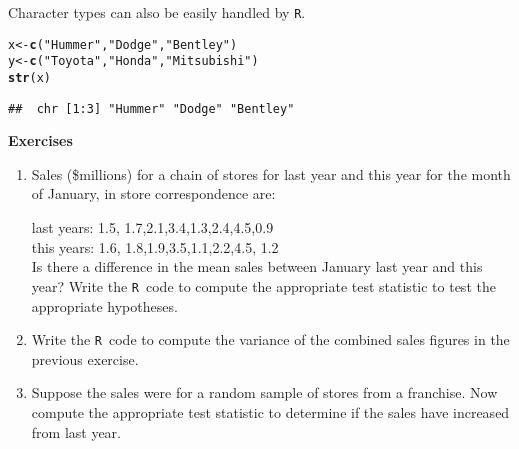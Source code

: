 \documentclass[12pt,A4,makeidx]{article}\usepackage[]{graphicx}\usepackage[]{xcolor}
\makeatletter
\newcommand{\hlstr}[1]{\textcolor[rgb]{0.192,0.494,0.8}{#1}}%
\newcommand{\hlstd}[1]{\textcolor[rgb]{0.345,0.345,0.345}{#1}}%
\newcommand{\hlkwb}[1]{\textcolor[rgb]{0.69,0.353,0.396}{#1}}%
\newcommand{\hlkwd}[1]{\textcolor[rgb]{0.737,0.353,0.396}{\textbf{#1}}}%
\newenvironment{kframe}{%
 \def\at@end@of@kframe{}%
 \ifinner\ifhmode%
  \def\at@end@of@kframe{\end{minipage}}%
  \begin{minipage}{\columnwidth}%
 \fi\fi%
 \def\FrameCommand##1{\hskip\@totalleftmargin \hskip-\fboxsep
 \colorbox{shadecolor}{##1}\hskip-\fboxsep
     \hskip-\linewidth \hskip-\@totalleftmargin \hskip\columnwidth}%
 \MakeFramed {\advance\hsize-\width
   \@totalleftmargin\z@ \linewidth\hsize
   \@setminipage}}%
 {\par\unskip\endMakeFramed%
 \at@end@of@kframe}
\newenvironment{knitrout}{}{} %
\newcommand{\tR}{\texttt{R}}
\makeatother
\begin{document}
Character types can also be easily handled by \tR.
\begin{knitrout}
\color{fgcolor}\begin{kframe}
\begin{alltt}
\hlstd{x}\hlkwb{<-}\hlkwd{c}\hlstd{(}\hlstr{"Hummer"}\hlstd{,}\hlstr{"Dodge"}\hlstd{,}\hlstr{"Bentley"}\hlstd{)}
\hlstd{y}\hlkwb{<-}\hlkwd{c}\hlstd{(}\hlstr{"Toyota"}\hlstd{,}\hlstr{"Honda"}\hlstd{,}\hlstr{"Mitsubishi"}\hlstd{)}
\hlkwd{str}\hlstd{(x)}
\end{alltt}
\begin{verbatim}
##  chr [1:3] "Hummer" "Dodge" "Bentley"
\end{verbatim}
\end{kframe}
\end{knitrout}

\vspace{0.5in}
{\bf Exercises}
\begin{enumerate}
\item Sales (\$millions)
for a chain of stores for last year and this year 
for the month of January, in store correspondence are:

last years: 1.5, 1.7,2.1,3.4,1.3,2.4,4.5,0.9\\
this years: 1.6, 1.8,1.9,3.5,1.1,2.2,4.5, 1.2\\

Is there a difference in the mean sales between January last year and this year? Write the \tR \ code to compute
the appropriate test statistic to test the appropriate hypotheses.
\item Write the \tR \ code to compute the variance of the combined sales figures in the previous exercise.
\item Suppose the sales were for a random sample of stores from a franchise. Now compute the appropriate test
statistic to determine if the sales have increased from last year.
\end{enumerate}
\end{document}
